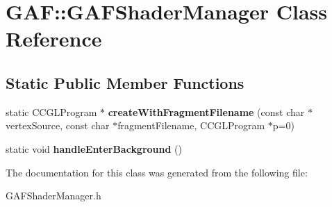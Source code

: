 \hypertarget{class_g_a_f_1_1_g_a_f_shader_manager}{\section{G\-A\-F\-:\-:G\-A\-F\-Shader\-Manager Class Reference}
\label{class_g_a_f_1_1_g_a_f_shader_manager}
}
\subsection*{Static Public Member Functions}
\begin{DoxyCompactItemize}
\item 
\hypertarget{class_g_a_f_1_1_g_a_f_shader_manager_aa84626fc0c83b107be542a6b9785caf0}{static C\-C\-G\-L\-Program $\ast$ {\bfseries create\-With\-Fragment\-Filename} (const char $\ast$vertex\-Source, const char $\ast$fragment\-Filename, C\-C\-G\-L\-Program $\ast$p=0)}\label{class_g_a_f_1_1_g_a_f_shader_manager_aa84626fc0c83b107be542a6b9785caf0}

\item 
\hypertarget{class_g_a_f_1_1_g_a_f_shader_manager_abdeeea4cf8690e67bc1f2ca3a5dac990}{static void {\bfseries handle\-Enter\-Background} ()}\label{class_g_a_f_1_1_g_a_f_shader_manager_abdeeea4cf8690e67bc1f2ca3a5dac990}

\end{DoxyCompactItemize}


The documentation for this class was generated from the following file\-:\begin{DoxyCompactItemize}
\item 
G\-A\-F\-Shader\-Manager.\-h\end{DoxyCompactItemize}
